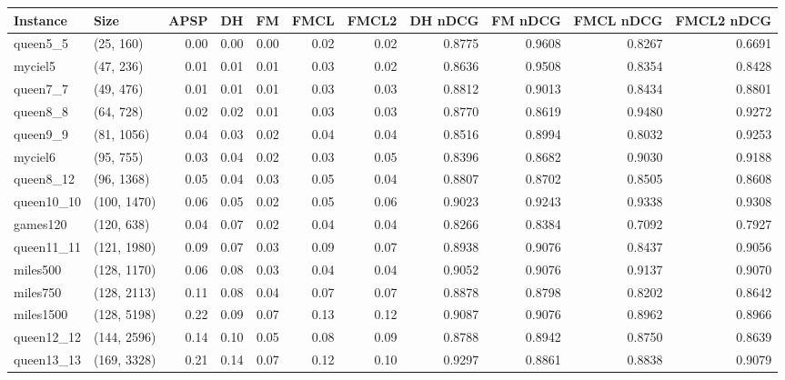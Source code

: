 \begin{tabular}{llrrrrrrrrr}
\toprule
  Instance &         Size &  APSP &   DH &   FM &  FMCL &  FMCL2 &  DH nDCG &  FM nDCG &  FMCL nDCG &  FMCL2 nDCG \\
\midrule
  queen5\_5 &    (25, 160) &  0.00 & 0.00 & 0.00 &  0.02 &   0.02 &   0.8775 &   0.9608 &     0.8267 &      0.6691 \\
   myciel5 &    (47, 236) &  0.01 & 0.01 & 0.01 &  0.03 &   0.02 &   0.8636 &   0.9508 &     0.8354 &      0.8428 \\
  queen7\_7 &    (49, 476) &  0.01 & 0.01 & 0.01 &  0.03 &   0.03 &   0.8812 &   0.9013 &     0.8434 &      0.8801 \\
  queen8\_8 &    (64, 728) &  0.02 & 0.02 & 0.01 &  0.03 &   0.03 &   0.8770 &   0.8619 &     0.9480 &      0.9272 \\
  queen9\_9 &   (81, 1056) &  0.04 & 0.03 & 0.02 &  0.04 &   0.04 &   0.8516 &   0.8994 &     0.8032 &      0.9253 \\
   myciel6 &    (95, 755) &  0.03 & 0.04 & 0.02 &  0.03 &   0.05 &   0.8396 &   0.8682 &     0.9030 &      0.9188 \\
 queen8\_12 &   (96, 1368) &  0.05 & 0.04 & 0.03 &  0.05 &   0.04 &   0.8807 &   0.8702 &     0.8505 &      0.8608 \\
queen10\_10 &  (100, 1470) &  0.06 & 0.05 & 0.02 &  0.05 &   0.06 &   0.9023 &   0.9243 &     0.9338 &      0.9308 \\
  games120 &   (120, 638) &  0.04 & 0.07 & 0.02 &  0.04 &   0.04 &   0.8266 &   0.8384 &     0.7092 &      0.7927 \\
queen11\_11 &  (121, 1980) &  0.09 & 0.07 & 0.03 &  0.09 &   0.07 &   0.8938 &   0.9076 &     0.8437 &      0.9056 \\
  miles500 &  (128, 1170) &  0.06 & 0.08 & 0.03 &  0.04 &   0.04 &   0.9052 &   0.9076 &     0.9137 &      0.9070 \\
  miles750 &  (128, 2113) &  0.11 & 0.08 & 0.04 &  0.07 &   0.07 &   0.8878 &   0.8798 &     0.8202 &      0.8642 \\
 miles1500 &  (128, 5198) &  0.22 & 0.09 & 0.07 &  0.13 &   0.12 &   0.9087 &   0.9076 &     0.8962 &      0.8966 \\
queen12\_12 &  (144, 2596) &  0.14 & 0.10 & 0.05 &  0.08 &   0.09 &   0.8788 &   0.8942 &     0.8750 &      0.8639 \\
queen13\_13 &  (169, 3328) &  0.21 & 0.14 & 0.07 &  0.12 &   0.10 &   0.9297 &   0.8861 &     0.8838 &      0.9079 \\

\end{tabular}
